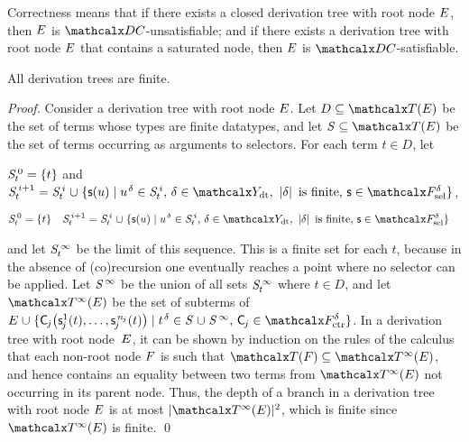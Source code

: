 Correctness means that if there exists a closed derivation tree with root node
$E$, then $E$ is $\thD$-unsatisfiable; and if there exists
a derivation tree with root node $E$ that contains a saturated node, then
$E$ is $\thD$-satisfiable.

\begin{theorem}[Termination]%
\label{thm:t}%
\afterDot
All derivation trees are finite.
\end{theorem}
\begin{proof}
Consider a derivation tree with root node $E$. Let $D \subseteq \tEc$ be the
set of terms whose types are finite datatypes, and let $\SSS \subseteq \tEc$ be
the set of terms occurring as arguments to selectors. For each term $t \in
D$\negvthinspace, let
\begin{conf}
$\smash{\mathit{S}^{\,0}_t} = \{ t \}$ and
$\smash{\SSSS {i+1}_t} = \smash{\SSSS i_t \mathrel\cup \{ \const s( u ) \mid u\typ{\delta} \in \SSSS i_t{,}}~\allowbreak\smash{ \delta \in \Data{,}~ \left|\delta\right| \text{ is finite}{,}~ \const{s} \in \Sel^{\delta}}  \}$,
\end{conf}%
\begin{rep}
\begin{align*}
\smash{\SSSS 0_t} & = \{ t \}
& \smash{\SSSS {i+1}_t} & = \smash{\SSSS i_t \mathrel\cup \{ \const s( u ) \mid u\typ{\delta} \in \SSSS i_t{,}~ \delta \in \Data{,}~ \left|\delta\right| \text{ is finite}{,}~ \const{s} \in \Sel^{\delta}}  \}
\end{align*}
\end{rep}%
and let $\mathit{S}^{\,\infty}_t$ be the limit of this sequence.
This is a finite set for each $t$, because in the absence of (co)recursion
one eventually reaches a point where no selector can be applied.
Let $\mathit{S}^{\,\infty}$ be the union of all sets $\mathit{S}^{\,\infty}_t$ where $t \in D$,
and let $\tcEc$ be the set of subterms of
%
$\Ec \mathrel\cup \{ \const C_{\negvthinspace j}\bigl( \const s^1_{\negvthinspace j}( t ), \ldots, \const s^{\smash{\,n_{\negvthinspace j}}}_{\negvthinspace j}( t ) \bigr) \mid t\typ{\delta} \in \SSS \mathrel\cup \SSSS \AST{,}~ \const C_{\negvthinspace j} \in \Ctr^\delta \}$.
%
In a derivation tree with root node~$E$,
it can be shown by %
induction on the rules of the calculus that each non-root node $F$ is such that
$\Terms(\Fc) \subseteq \tcEc$, and hence contains an equality between two terms from $\tcEc$ not occurring in its parent node.
Thus, the depth of a branch in a derivation tree with root node $E$ is at most $\left| \smash{\tcEc}\vphantom{X} \right|{\!}^2$,
which is finite since $\tcEc$ is finite.
\qed
\end{proof}

